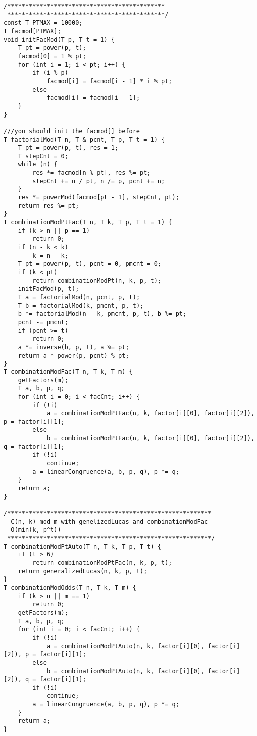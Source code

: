 \begin{verbatim}
/********************************************
 ********************************************/
const T PTMAX = 10000;
T facmod[PTMAX];
void initFacMod(T p, T t = 1) {
    T pt = power(p, t);
    facmod[0] = 1 % pt;
    for (int i = 1; i < pt; i++) {
        if (i % p)
            facmod[i] = facmod[i - 1] * i % pt;
        else
            facmod[i] = facmod[i - 1];
    }
}

///you should init the facmod[] before
T factorialMod(T n, T & pcnt, T p, T t = 1) {
    T pt = power(p, t), res = 1;
    T stepCnt = 0;
    while (n) {
        res *= facmod[n % pt], res %= pt;
        stepCnt += n / pt, n /= p, pcnt += n;
    }
    res *= powerMod(facmod[pt - 1], stepCnt, pt);
    return res %= pt;
}
T combinationModPtFac(T n, T k, T p, T t = 1) {
    if (k > n || p == 1)
        return 0;
    if (n - k < k)
        k = n - k;
    T pt = power(p, t), pcnt = 0, pmcnt = 0;
    if (k < pt)
        return combinationModPt(n, k, p, t);
    initFacMod(p, t);
    T a = factorialMod(n, pcnt, p, t);
    T b = factorialMod(k, pmcnt, p, t);
    b *= factorialMod(n - k, pmcnt, p, t), b %= pt;
    pcnt -= pmcnt;
    if (pcnt >= t)
        return 0;
    a *= inverse(b, p, t), a %= pt;
    return a * power(p, pcnt) % pt;
}
T combinationModFac(T n, T k, T m) {
    getFactors(m);
    T a, b, p, q;
    for (int i = 0; i < facCnt; i++) {
        if (!i)
            a = combinationModPtFac(n, k, factor[i][0], factor[i][2]), p = factor[i][1];
        else
            b = combinationModPtFac(n, k, factor[i][0], factor[i][2]), q = factor[i][1];
        if (!i)
            continue;
        a = linearCongruence(a, b, p, q), p *= q;
    }
    return a;
}

/*********************************************************
  C(n, k) mod m with genelizedLucas and combinationModFac
  O(min(k, p^t))
 *********************************************************/
T combinationModPtAuto(T n, T k, T p, T t) {
    if (t > 6)
        return combinationModPtFac(n, k, p, t);
    return generalizedLucas(n, k, p, t);
}
T combinationModOdds(T n, T k, T m) {
    if (k > n || m == 1)
        return 0;
    getFactors(m);
    T a, b, p, q;
    for (int i = 0; i < facCnt; i++) {
        if (!i)
            a = combinationModPtAuto(n, k, factor[i][0], factor[i][2]), p = factor[i][1];
        else
            b = combinationModPtAuto(n, k, factor[i][0], factor[i][2]), q = factor[i][1];
        if (!i)
            continue;
        a = linearCongruence(a, b, p, q), p *= q;
    }
    return a;
}
\end{verbatim}
